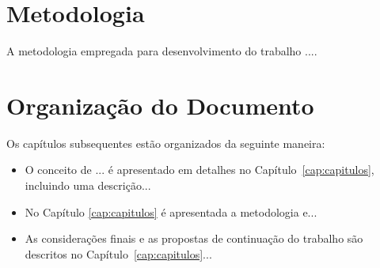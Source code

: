 \section{Metodologia}
\label{sec:metodologia}

A metodologia empregada para desenvolvimento do trabalho ....




\section{Organização do Documento}
\label{sec:organizacao}

Os capítulos subsequentes estão organizados da seguinte maneira:

\begin{itemize}
  \item O conceito de ... é apresentado em detalhes no Capítulo~\ref{cap:capitulos}, incluindo uma descrição...

  \item No Capítulo \ref{cap:capitulos} é apresentada a metodologia e...

  \item As considerações finais e as propostas de continuação do trabalho são descritos no Capítulo~\ref{cap:capitulos}...
\end{itemize}

